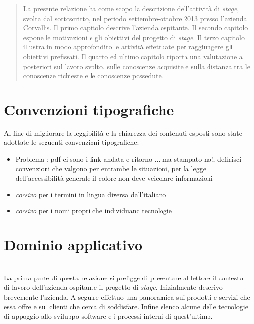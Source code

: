 \newcommand{\Versione}{1.0}%
\newcommand{\Data}{2013-01-21}%




\null\vspace{2.0in}
\begin{abstract}
La presente relazione ha come scopo la descrizione dell'attività di \emph{stage}, svolta dal sottoscritto, nel periodo settembre-ottobre 2013 presso l'azienda Corvallis. Il primo capitolo descrive l'azienda ospitante. Il secondo capitolo espone le motivazioni e gli obiettivi del progetto di \emph{stage}. Il terzo capitolo illustra in modo approfondito le attività effettuate per raggiungere gli obiettivi prefissati. Il quarto ed ultimo capitolo riporta una valutazione a posteriori sul lavoro svolto, sulle conoscenze acquisite e sulla distanza tra le conoscenze richieste e le conoscenze possedute.
\end{abstract}
\vspace{\fill}
%
\newpage
\section*{Convenzioni tipografiche}
Al fine di migliorare la leggibilità e la chiarezza dei contenuti esposti sono state adottate le seguenti convenzioni tipografiche:
\begin{itemize}
\item Problema : pdf ci sono i link andata e ritorno ... ma stampato no!, definisci convenzioni che valgono per entrambe le situazioni, per la legge dell'accessibilità generale il colore non deve veicolare informazioni
\item \emph{corsivo} per i termini in lingua diversa dall'italiano
\item \emph{corsivo} per i nomi propri che individuano tecnologie
\end{itemize}

\newpage
\tableofcontents

\newpage

\listoftables
\listoffigures

\newpage

\section{Dominio applicativo}\\
\label{1.0}
La prima parte di questa relazione si prefigge di presentare al lettore il contesto di lavoro dell'azienda ospitante il progetto di \emph{stage}. Inizialmente descrivo brevemente l'azienda. A seguire effettuo una panoramica sui prodotti e servizi che essa offre e sui clienti che cerca di soddisfare. Infine elenco alcune delle tecnologie di appoggio allo sviluppo software e i processi interni di quest'ultimo.

